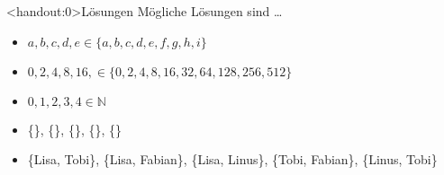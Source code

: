 {
\begin{frame}<handout:0>{Lösungen}
    Mögliche Lösungen sind \dots
    \begin{itemize}[<+- | alert@+>]
        \item $a, b, c, d, e \in \{a, b, c, d, e, f, g, h, i\}$
        \item $0, 2, 4, 8, 16,\in \{0, 2, 4, 8, 16, 32, 64, 128, 256, 512\}$
        \item $0,1,2,3,4 \in \mathbb N$
        \item \{\WashCotton\}, \{\NoWash\}, \{\IroningII\}, \{\Tumbler\}, \{\SpecialForty \}
        \item \{Lisa, Tobi\}, \{Lisa, Fabian\}, \{Lisa, Linus\}, \{Tobi, Fabian\}, \{Linus, Tobi\}
    \end{itemize}
\end{frame}
}
